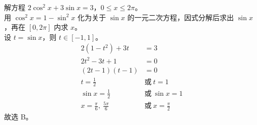 \documentclass[12pt,a4paper,fontset=none]{exam-zh}
\begin{document}
\begin{solution}
    解方程 $2\cos^2x+3\sin x=3$，$0\le x\le2\pi$。 \\
    用 $\cos^2x=1-\sin^2x$ 化为关于 $\sin x$ 的一元二次方程，因式分解后求出 $\sin x$，再在 $[0,2\pi]$ 内求 $x$。 \\
    设 $t=\sin x$，则 $t\in[-1,1]$。
    \begin{align*}
        2(1-t^2)+3t &= 3 \\
        2t^2-3t+1 &= 0 \\
        (2t-1)(t-1) &= 0 \\
        t=\frac{1}{2}\ &\text{或}\ t=1 \\
        \sin x=\frac{1}{2}\ &\text{或}\ \sin x=1 \\
        x=\frac{\pi}{6},\ \frac{5\pi}{6}\ &\text{或}\ x=\frac{\pi}{2}
    \end{align*}
    故选 B。
\end{solution}


\end{document}
